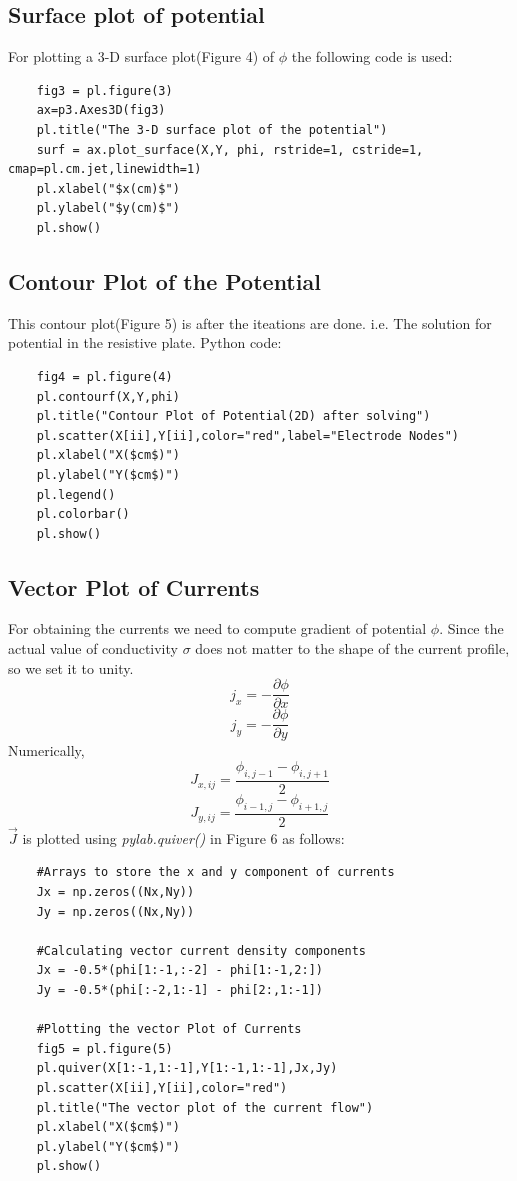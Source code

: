 \documentclass[11pt, a4paper]{article}
\begin{document}
    \subsection{Surface plot of potential}
    For plotting a 3-D surface plot(Figure 4) of $\phi$ the following code is used:
    \begin{verbatim}
    fig3 = pl.figure(3)
    ax=p3.Axes3D(fig3)
    pl.title("The 3-D surface plot of the potential")
    surf = ax.plot_surface(X,Y, phi, rstride=1, cstride=1, cmap=pl.cm.jet,linewidth=1)
    pl.xlabel("$x(cm)$")
    pl.ylabel("$y(cm)$")
    pl.show()        
    \end{verbatim}
    \subsection{Contour Plot of the Potential}
    This contour plot(Figure 5) is after the iteations are done. i.e. The solution for potential in the resistive plate. Python code:
    \begin{verbatim}
    fig4 = pl.figure(4)
    pl.contourf(X,Y,phi)    
    pl.title("Contour Plot of Potential(2D) after solving")
    pl.scatter(X[ii],Y[ii],color="red",label="Electrode Nodes")
    pl.xlabel("X($cm$)")
    pl.ylabel("Y($cm$)")
    pl.legend()
    pl.colorbar()
    pl.show()
    \end{verbatim}
    \subsection{Vector Plot of Currents}
    For obtaining the currents we need to compute gradient of potential $\phi$. Since the actual value of conductivity $\sigma$ does not matter to the shape of the current profile, so we set it to unity.
    \begin{equation*}
        j_x = -\frac{\partial \phi}{\partial x}
    \end{equation*}
    \begin{equation*}
        j_y = -\frac{\partial \phi}{\partial y}
    \end{equation*}
    Numerically,
    \begin{equation*}
        J_{x,ij} = \frac{\phi_{i,j-1} - \phi_{i,j+1}}{2}
    \end{equation*}
    \begin{equation*}
        J_{y,ij} = \frac{\phi_{i-1,j} - \phi_{i+1,j}}{2}
    \end{equation*}
    $\Vec{J}$ is plotted using \textit{pylab.quiver()} in Figure 6 as follows:
    \begin{verbatim}
    #Arrays to store the x and y component of currents
    Jx = np.zeros((Nx,Ny))
    Jy = np.zeros((Nx,Ny))
    
    #Calculating vector current density components
    Jx = -0.5*(phi[1:-1,:-2] - phi[1:-1,2:])
    Jy = -0.5*(phi[:-2,1:-1] - phi[2:,1:-1])
    
    #Plotting the vector Plot of Currents
    fig5 = pl.figure(5)
    pl.quiver(X[1:-1,1:-1],Y[1:-1,1:-1],Jx,Jy)
    pl.scatter(X[ii],Y[ii],color="red")
    pl.title("The vector plot of the current flow")
    pl.xlabel("X($cm$)")
    pl.ylabel("Y($cm$)")
    pl.show()
    \end{verbatim}
\end{document}
